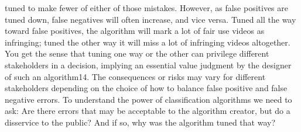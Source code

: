 tuned to make fewer of either of those mistakes. However, as false positives are tuned down, false negatives will often increase, and vice versa. Tuned all the way toward false positives, the algorithm will mark a lot of fair use videos as infringing; tuned the other way it will miss a lot of infringing videos altogether. You get the sense that tuning one way or the other can privilege different stakeholders in a decision, implying an essential value judgment by the designer of such an algorithm14. The consequences or risks may vary for different stakeholders depending on the choice of how to balance false positive and false negative errors. To understand the power of classification algorithms we need to ask: Are there errors that may be acceptable to the algorithm creator, but do a disservice to the public? And if so, why was the algorithm tuned that way? 
